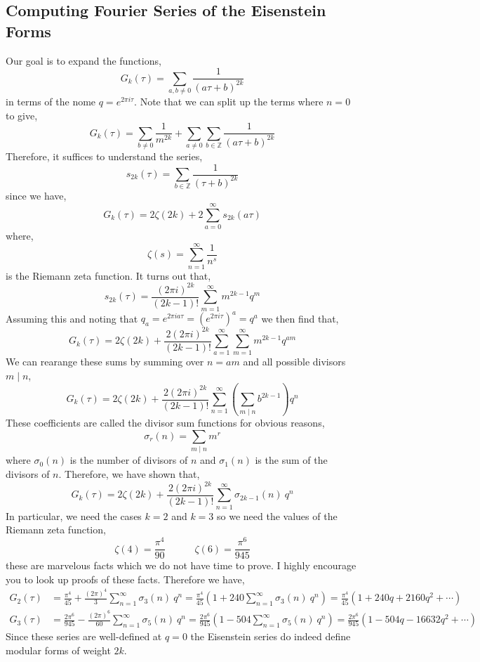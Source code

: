 \documentclass{article}
\newcommand{\divides}{\mid}
\newcommand{\Z}{\mathbb{Z}}
\theoremstyle{definition}
\begin{document}
\subsection{Computing Fourier Series of the Eisenstein Forms}

Our goal is to expand the functions,
\[ G_{k}(\tau) = \sum_{a,b \neq 0} \frac{1}{(a \tau + b)^{2k}} \]
in terms of the nome $q = e^{2 \pi i \tau}$. Note that we can split up the terms where $n = 0$ to give,
\[ G_{k}(\tau) = \sum_{b \neq 0} \frac{1}{m^{2k}} + \sum_{a \neq 0} \sum_{b \in \Z} \frac{1}{(a \tau + b)^{2k}}  \]
Therefore, it suffices to understand the series,
\[ s_{2k}(\tau) = \sum_{b \in \Z} \frac{1}{(\tau + b)^{2k}} \]
since we have,
\[ G_{k}(\tau) = 2 \zeta(2k) + 2 \sum_{a = 0}^\infty s_{2k}(a \tau) \]
where,
\[ \zeta(s) = \sum_{n = 1}^{\infty} \frac{1}{n^s} \]
is the Riemann zeta function.
It turns out that,
\[ s_{2k}(\tau) = \frac{(2 \pi i)^{2k}}{(2k - 1)!} \sum_{m = 1}^\infty m^{2k - 1} q^m \]
Assuming this and noting that $q_a = e^{2 \pi i a \tau} = (e^{2 \pi i \tau})^a = q^a$ we then find that,
\[ G_{k}(\tau) = 2 \zeta(2 k) + \frac{2 (2 \pi i)^{2k}}{(2 k - 1)!} \sum_{a = 1}^{\infty} \sum_{m = 1}^{\infty} m^{2k - 1} q^{am} \]
We can rearange these sums by summing over $n = am$ and all possible divisors $m \divides n$,
\[ G_{k}(\tau) = 2 \zeta(2 k) + \frac{2 (2 \pi i)^{2k}}{(2 k - 1)!} \sum_{n = 1}^{\infty} \left( \sum_{m \divides n} b^{2k - 1} \right) q^n \]
These coefficients are called the divisor sum functions for obvious reasons,
\[ \sigma_{r}(n) = \sum_{m \divides n} m^r \]
where $\sigma_0(n)$ is the number of divisors of $n$ and $\sigma_1(n)$ is the sum of the divisors of $n$. Therefore, we have shown that,
\[ G_{k}(\tau) = 2 \zeta(2 k) + \frac{2 (2 \pi i)^{2k}}{(2 k - 1)!} \sum_{n = 1}^{\infty} \sigma_{2k - 1}(n) \: q^n \]
In particular, we need the cases $k = 2$ and $k = 3$ so we need the values of the Riemann zeta function,
\[ \zeta(4) = \frac{\pi^4}{90} \quad \quad \quad \zeta(6) = \frac{\pi^6}{945} \]
these are marvelous facts which we do not have time to prove. I highly encourage you to look up proofs of these facts. Therefore we have,
\begin{align*}
G_2(\tau) & = \frac{\pi^4}{45} + \frac{(2 \pi)^4}{3} \sum_{n = 1}^{\infty} \sigma_{3}(n) \:  q^n = \frac{\pi^4}{45} \left( 1 + 240 \sum_{n = 1}^{\infty} \sigma_{3}(n) \:  q^n\right) = \frac{\pi^4}{45} \left( 1 + 240 q + 2160 q^2 + \cdots \right)
\\
G_3(\tau) & = \frac{2 \pi^6}{945} - \frac{(2 \pi)^6}{60} \sum_{n = 1}^{\infty} \sigma_{5}(n) \: q^n = \frac{2\pi^6}{945} \left( 1 - 504 \sum_{n = 1}^{\infty} \sigma_5(n) \: q^n \right) = \frac{2\pi^6}{945} \left( 1 - 504 q - 16632 q^2 + \cdots\right)
\end{align*} 
Since these series are well-defined at $q = 0$ the Eisenstein series do indeed define modular forms of weight $2k$. 
\end{document}
